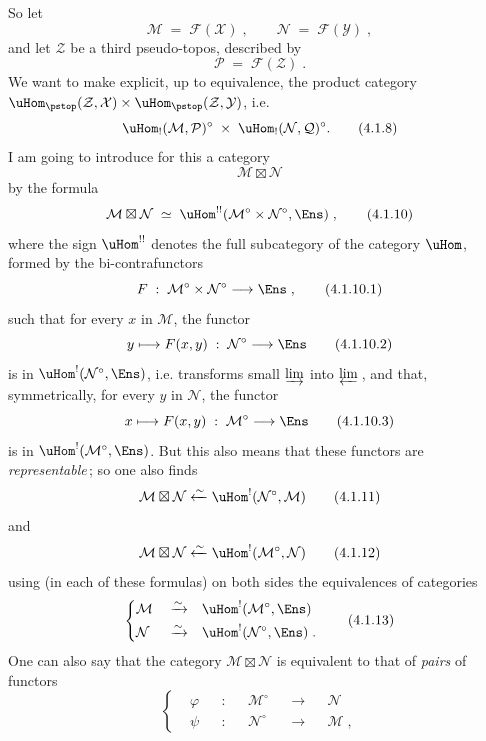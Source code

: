 So let
\[
\mathcal{M} \;=\; \mathcal{F}(\mathcal{X})\;, \qquad \mathcal{N} \;=\; \mathcal{F}(\mathcal{Y})\;,
\tag*{(4.1.6)}
\]
and let $\mathcal{Z}$ be a third pseudo-topos, described by
\[
\mathcal{P} \;=\; \mathcal{F}(\mathcal{Z})\;.
\tag*{(4.1.7)}
\]
We want to make explicit, up to equivalence, the product category $\uHom_{\pstop}(\mathcal{Z},\mathcal{X})\times\uHom_{\pstop}(\mathcal{Z},\mathcal{Y})$, i.e.
\[
\uHom_!(\mathcal{M},\mathcal{P})^\circ \;\times\; \uHom_!(\mathcal{N},\mathcal{Q})^\circ.
\tag*{(4.1.8)}
\] %
I am going to introduce for this a category
\[
\mathcal{M}\boxtimes\mathcal{N}
\tag*{(4.1.9)}
\]
by the formula
\[
\mathcal{M}\boxtimes\mathcal{N} \;\simeq\; \uHom^{!!}(\mathcal{M}^\circ\times\mathcal{N}^\circ,\Ens)\;,
\tag*{(4.1.10)}
\]
where the sign $\uHom^{!!}$ denotes the full subcategory of the category $\uHom$, formed by the bi-contrafunctors %
\[
F \;:\; \mathcal{M}^\circ\times\mathcal{N}^\circ \longrightarrow \Ens\;,
\tag*{(4.1.10.1)}
\]
such that for every $x$ in $\mathcal{M}$, the functor
\[
y \longmapsto F(x,y) \;:\; \mathcal{N}^\circ \longrightarrow \Ens
\tag*{(4.1.10.2)}
\]
is in $\uHom^!(\mathcal{N}^\circ,\Ens)$, i.e. transforms small $\varinjlim$ into $\varprojlim$\,, and that, symmetrically, for every $y$ in $\mathcal{N}$, the functor
\[
x \longmapsto F(x,y) \;:\; \mathcal{M}^\circ \longrightarrow \Ens
\tag*{(4.1.10.3)}
\]
is in $\uHom^!(\mathcal{M}^\circ,\Ens)$. But this also means that these functors are \textit{representable}\,; so one also finds
\[
\mathcal{M}\boxtimes\mathcal{N} \xleftarrow{\sim} \uHom^!(\mathcal{N}^\circ,\mathcal{M})
\tag*{(4.1.11)}
\]
and
\[
\mathcal{M}\boxtimes\mathcal{N} \xleftarrow{\sim} \uHom^!(\mathcal{M}^\circ,\mathcal{N})
\tag*{(4.1.12)}
\]
using (in each of these formulas) on both sides the equivalences of categories
\[
\left\{
\begin{aligned}
&\mathcal{M} &&\xrightarrow{\sim} &&\uHom^!(\mathcal{M}^\circ,\Ens)\\
&\mathcal{N} &&\xrightarrow{\sim} &&\uHom^!(\mathcal{N}^\circ,\Ens)\;.
\end{aligned}
\right.
\tag*{(4.1.13)}
\]
One can also say that the category $\mathcal{M}\boxtimes\mathcal{N}$ is equivalent to that of \textit{pairs} of functors
\[
\left\{
\begin{aligned}
&\varphi &&: &&\mathcal{M}^\circ &&\longrightarrow &&\mathcal{N}\\
&\psi &&: &&\mathcal{N}^\circ &&\longrightarrow &&\mathcal{M}\;,
\end{aligned}
\right.
\tag*{(4.1.14)}
\]
